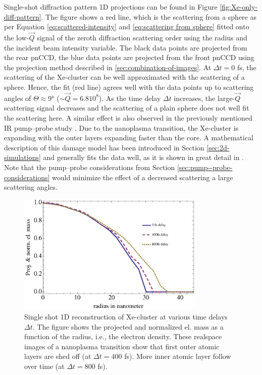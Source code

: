Single-shot diffraction pattern 1D projections can be found in Figure \ref{fig:Xe-only-diff-pattern}. The figure shows a red line, which is the scattering from a sphere as per Equation \eqref{eq:scattered-intensity} and \eqref{eq:scattering from sphere} fitted onto the low-$\vec{Q}$ signal of the zeroth diffraction scattering order using the radius and the incident beam intensity variable. The black data points are projected from the rear pnCCD, the blue data points are projected from the front pnCCD using the projection method described in \ref{sec:combination-of-images}. At $\Delta t=0$ fs, the scattering of the Xe-cluster can be well approximated with the scattering of a sphere. Hence, the fit (red line) agrees well with the data points up to scattering angles of $\Theta \approx 9$° ($\sim \vec{Q}=6.8 10^{8}$). As the time delay $\Delta t$ increases, the large-$\vec{Q}$ scattering signal decreases and the scattering of a plain sphere does not well fit the scattering here. A similar effect is also observed in the previously mentioned IR pump--probe study \citep{Gorkhover-2016-NatPho}. Due to the nanoplasma transition, the Xe-cluster is expanding with the outer layers expanding faster than the core. A mathematical description of this damage model has been introduced in Section \ref{sec:2d-simulations} and generally fits the data well, as it is shown in great detail in \citep{Gorkhover-2016-NatPho,Gorkhover-2014-Thesis}. Note that the pump--probe considerations from Section \ref{sec:pump--probe-considerations} would minimize the effect of a decreased scattering a large scattering angles.\\
\begin{figure}
	\centering
		\includegraphics[width=0.80\textwidth]{images/results/Xe-reconstructions.eps}
	\caption[Single-shot 1D reconstruction of $\sim 30$ nm radius Xe-cluster]{Single shot 1D reconstruction of Xe-cluster at various time delays $\Delta t$. The figure shows the projected and normalized el. mass as a function of the radius, i.e., the electron density. These realspace images of a nanoplasma transition show that first outer atomic layers are shed off (at $\Delta t=400$ fs). More inner atomic layer follow over time (at $\Delta t= 800$ fs).}
	\label{fig:Xe-reconstructions}
\end{figure}

